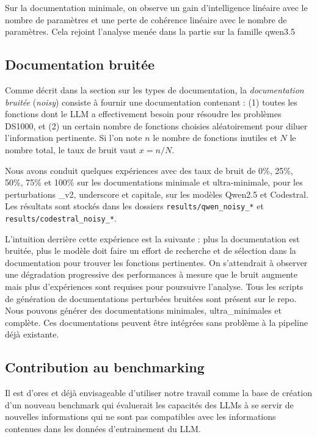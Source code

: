 \documentclass[11pt, a4paper]{article}
\begin{document}
Sur la documentation minimale, on observe un gain d'intelligence linéaire avec le nombre de paramètres et une perte de cohérence linéaire avec le nombre de paramètres. Cela rejoint l'analyse menée dans la partie sur la famille qwen3.5

\subsection{Documentation bruitée} \label{sec:noisy_doc}

Comme décrit dans la section sur les types de documentation, la \textit{documentation bruitée} (\textit{noisy}) consiste à fournir une documentation contenant : (1) toutes les fonctions dont le LLM a effectivement besoin pour résoudre les problèmes DS1000, et (2) un certain nombre de fonctions choisies aléatoirement pour diluer l'information pertinente. Si l'on note $n$ le nombre de fonctions inutiles et $N$ le nombre total, le taux de bruit vaut $x = n/N$.

Nous avons conduit quelques expériences avec des taux de bruit de 0\%, 25\%, 50\%, 75\% et 100\% sur les documentations minimale et ultra-minimale, pour les perturbations \_v2, underscore et capitale, sur les modèles Qwen2.5 et Codestral. Les résultats sont stockés dans les dossiers \texttt{results/qwen\_noisy\_*} et \texttt{results/codestral\_noisy\_*}.

L'intuition derrière cette expérience est la suivante : plus la documentation est bruitée, plus le modèle doit faire un effort de recherche et de sélection dans la documentation pour trouver les fonctions pertinentes. On s'attendrait à observer une dégradation progressive des performances à mesure que le bruit augmente mais plus d'expériences sont requises pour poursuivre l'analyse. Tous les scripts de génération de documentations perturbées bruitées sont présent sur le repo. Nous pouvons générer des documentations minimales, ultra\_minimales et complète. Ces documentations peuvent être intégrées sans problème à la pipeline déjà existante.



 
\subsection{Contribution au benchmarking}
Il est d'ores et déjà envisageable d'utiliser notre travail comme la base de création d'un nouveau benchmark qui évaluerait les capacités des LLMs à se servir de nouvelles informations qui ne sont pas compatibles avec les informations contenues dans les données d'entrainement du LLM. 
\end{document}
